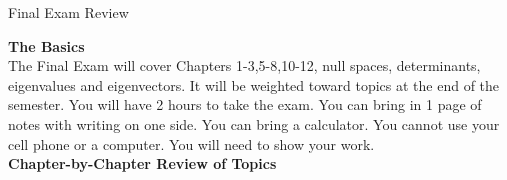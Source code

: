 \documentclass[11pt,fleqn]{article}
\begin{document}
\begin{center}{\Large{Final Exam Review}}\end{center}


\noindent\textbf{The Basics}\\

The Final Exam will cover Chapters 1-3,5-8,10-12, null spaces, determinants, eigenvalues and eigenvectors. It will be weighted toward topics at the end of the semester. You will have 2 hours to take the exam. You can bring in 1 page of notes with writing on one side. You can bring a calculator. You cannot use your cell phone or a computer. You will need to show your work.\\

\noindent\textbf{Chapter-by-Chapter Review of Topics}\\
\end{document}

